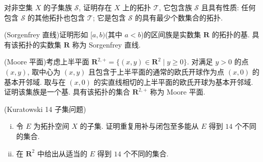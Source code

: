 \documentclass[../../main.tex]{subfiles}
\begin{document}
\begin{exercise}\label{exercise:ch11-08}
对非空集 $X$ 的子集族 $\mathcal{S}$, 证明存在 $X$ 上的拓扑 $\mathcal{T}$, 它包含族 $\mathcal{S}$ 且具有性质: 任何包含 $\mathcal{S}$ 的其他拓扑也包含 $\mathcal{T}$; 它是包含 $\mathcal{S}$ 的具有最少个数集合的拓扑.
\end{exercise}

\begin{exercise}\label{exercise:ch11-09}
(Sorgenfrey 直线)证明形如 $[a,b)$(其中 $a<b$)的区间族是实数集 $\mathbf{R}$ 的拓扑的基. 具有该拓扑的实数集 $\mathbf{R}$ 称为 Sorgenfrey 直线.
\end{exercise}

\begin{exercise}\label{exercise:ch11-10}
(Moore 平面)考虑上半平面 $\mathbf{R}^{2,+}=\{(x,y)\in\mathbf{R}^{2}\mid y\geqslant 0\}$. 对满足 $y>0$ 的点 $(x,y)$, 取中心为 $(x,y)$ 且包含于上半平面的通常的欧氏开球作为点 $(x,0)$ 的基本开邻域. 取与在 $(x,0)$ 的实直线相切的上半平面的欧氏开球为基本开邻域. 证明该集族是一个基. 具有该拓扑的集合 $\mathbf{R}^{2,+}$ 称为 Moore 平面.
\end{exercise}

\begin{exercise}\label{exercise:ch11-11}
(Kuratowski 14 子集问题)
\begin{enumerate}[(i)]
\item 令 $E$ 为拓扑空间 $X$ 的子集. 证明重复用补与闭包至多能从 $E$ 得到 $14$ 个不同的集合.
\item 在 $\mathbf{R}^{2}$ 中给出从适当的 $E$ 得到 $14$ 个不同的集合.
\end{enumerate}
\end{exercise}
\end{document}
